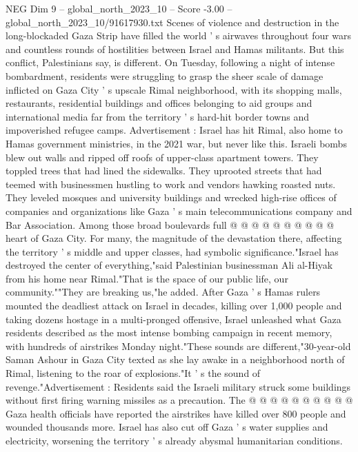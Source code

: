 \begin{textsample}{NEG Dim 9 – global\_north\_2023\_10 – Score -3.00 – global\_north\_2023\_10/91617930.txt}  \label{ex:f9_neg_148}
Scenes of violence and destruction in the long-blockaded Gaza Strip have filled the world ' s airwaves throughout four wars and countless rounds of hostilities between Israel and Hamas militants.
But this conflict, Palestinians say, is different.
On Tuesday, following a night of intense bombardment, residents were struggling to grasp the sheer scale of damage inflicted on Gaza City ' s upscale Rimal neighborhood, with its shopping malls, restaurants, residential buildings and offices belonging to aid groups and international media far from the territory ' s hard-hit border towns and impoverished refugee camps.
Advertisement : Israel has hit Rimal, also home to Hamas government ministries, in the 2021 war, but never like this.
Israeli bombs blew out walls and ripped off roofs of upper-class apartment towers.
They toppled trees that had lined the sidewalks.
They uprooted streets that had teemed with businessmen hustling to work and vendors hawking roasted nuts.
They leveled mosques and university buildings and wrecked high-rise offices of companies and organizations like Gaza ' s main telecommunications company and Bar Association.
Among those broad boulevards full @ @ @ @ @ @ @ @ @ @ heart of Gaza City.
For many, the magnitude of the devastation there, affecting the territory ' s middle and upper classes, had symbolic significance."Israel has destroyed the center of everything,"said Palestinian businessman Ali al-Hiyak from his home near Rimal."That is the space of our public life, our community.""They are breaking us,"he added.
After Gaza ' s Hamas rulers mounted the deadliest attack on Israel in decades, killing over 1,000 people and taking dozens hostage in a multi-pronged offensive, Israel unleashed what Gaza residents described as the most intense bombing campaign in recent memory, with hundreds of airstrikes Monday night."These sounds are different,"30-year-old Saman Ashour in Gaza City texted as she lay awake in a neighborhood north of Rimal, listening to the roar of explosions."It ' s the sound of revenge."Advertisement : Residents said the Israeli military struck some buildings without first firing warning missiles as a precaution.
The @ @ @ @ @ @ @ @ @ @ Gaza health officials have reported the airstrikes have killed over 800 people and wounded thousands more.
Israel has also cut off Gaza ' s water supplies and electricity, worsening the territory ' s already abysmal humanitarian conditions.

\end{textsample}
